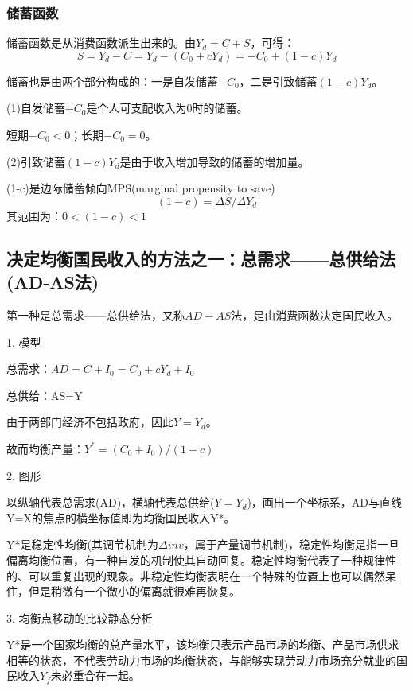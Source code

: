 \documentclass{article}
\begin{document}
\subsubsection{储蓄函数}
储蓄函数是从消费函数派生出来的。由$ Y_d=C+S $，可得：
\[
S=Y_d-C=Y_d-(C_0+cY_d)=-C_0+(1-c)Y_d
\]

储蓄也是由两个部分构成的：一是自发储蓄$ -C_0 $，二是引致储蓄$ (1-c)Y_d $。

(1)自发储蓄$ -C_0 $是个人可支配收入为0时的储蓄。

短期$ -C_0<0 $；长期$ -C_0=0 $。

(2)引致储蓄$ (1-c)Y_d $是由于收入增加导致的储蓄的增加量。

\hspace*{\fill}

(1-c)是边际储蓄倾向MPS(marginal propensity to save)
\[
(1-c)=\Delta S/\Delta Y_d
\]
其范围为：$ 0<(1-c)<1 $

\subsection{决定均衡国民收入的方法之一：总需求——总供给法(AD-AS法)}
第一种是总需求——总供给法，又称$ AD-AS $法，是由消费函数决定国民收入。

1. 模型

总需求：$ AD=C+I_0=C_0+cY_d+I_0 $

总供给：AS=Y

\hspace*{\fill}

由于两部门经济不包括政府，因此$ Y=Y_d $。

故而均衡产量：$ Y^*=(C_0+I_0)/(1-c) $

\hspace*{\fill}

2. 图形

以纵轴代表总需求(AD)，横轴代表总供给($ Y=Y_d $)，画出一个坐标系，AD与直线Y=X的焦点的横坐标值即为均衡国民收入Y*。

Y*是稳定性均衡(其调节机制为$ \Delta inv $，属于产量调节机制)，稳定性均衡是指一旦偏离均衡位置，有一种自发的机制使其自动回复。稳定性均衡代表了一种规律性的、可以重复出现的现象。非稳定性均衡表明在一个特殊的位置上也可以偶然呆住，但是稍微有一个微小的偏离就很难再恢复。

\hspace*{\fill}

3. 均衡点移动的比较静态分析

Y*是一个国家均衡的总产量水平，该均衡只表示产品市场的均衡、产品市场供求相等的状态，不代表劳动力市场的均衡状态，与能够实现劳动力市场充分就业的国民收入$ Y_f $未必重合在一起。
\end{document}
